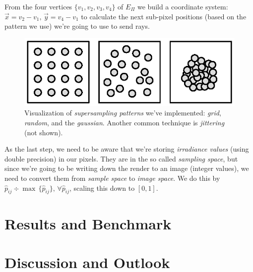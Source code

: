 \documentclass[a4paper, twocolumn]{article}
\begin{document}
            From the four vertices \(\{v_1, v_2, v_3, v_4\}\) of \(E_\Pi\) we build a coordinate system: \(\vec{x} = v_2 - v_1,\, \vec{y} = v_4 - v_1\) to calculate the next sub-pixel positions (based on the pattern we use) we're going to use to send rays.

            \begin{figure}[ht]
                \centering
                \includegraphics[width=\linewidth]{share/sampling_methods.eps}
                \caption{Visualization of \emph{supersampling patterns} we've implemented: \emph{grid}, \emph{random}, and the \emph{gaussian}. Another common technique is \emph{jittering} (not shown).}
                \label{fig:sampling_methods}
            \end{figure}

            As the last step, we need to be aware that we're storing \emph{irradiance values} (using double precision) in our pixels. They are in the so called \emph{sampling space}, but since we're going to be writing down the render to an image (integer values), we need to convert them from \emph{sample space} to \emph{image space}. We do this by \(\hat{p}_{ij} \div \max\, \{\hat{p}_{ij}\},\, \forall \hat{p}_{ij}\), scaling this down to \([0,1]\).

    \section{Results and Benchmark} \label{sec:results_and_benchmark}

    \section{Discussion and Outlook} \label{sec:discussion_and_outlook}

    \newpage %
    \nocite{*} %
    
    
\end{document}
